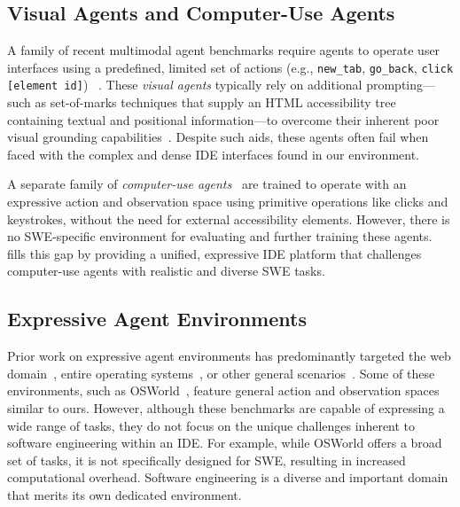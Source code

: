 \subsection{Visual Agents and Computer-Use Agents}

A family of recent multimodal agent benchmarks require agents to operate user interfaces using a predefined, limited set of actions (e.g., \texttt{new\_tab}, \texttt{go\_back}, \texttt{click [element id]})~\cite{koh2024visualwebarenaevaluatingmultimodalagents, deng2023mind2webgeneralistagentweb, zheng2024gpt} . 
These \textit{visual agents} typically rely on additional prompting—such as set-of-marks techniques that supply an HTML accessibility tree containing textual and positional information—to overcome their inherent poor visual grounding capabilities~\cite{yang2023setofmarkpromptingunleashesextraordinary}. 
Despite such aids, these agents often fail when faced with the complex and dense IDE interfaces found in our environment.

A separate family of \textit{computer-use agents}~\cite{anthropic2024developing,openai2025introducing,gou2024navigatingdigitalworldhumans} are trained to operate with an expressive action and observation space using primitive operations like clicks and keystrokes, without the need for external accessibility elements. However, there is no SWE-specific environment for evaluating and further training these agents. \ours{} fills this gap by providing a unified, expressive IDE platform that challenges computer-use agents with realistic and diverse SWE tasks.

\subsection{Expressive Agent Environments}

Prior work on expressive agent environments has predominantly targeted the web domain~\cite{koh2024visualwebarenaevaluatingmultimodalagents, deng2023mind2webgeneralistagentweb}, entire operating systems~\cite{xie2024osworldbenchmarkingmultimodalagents, bonatti2024windowsagentarenaevaluating, NEURIPS2023_bbbb6308}, or other general scenarios~\cite{xu2024theagentcompanybenchmarkingllmagents}. Some of these environments, such as OSWorld~\cite{xie2024osworldbenchmarkingmultimodalagents}, feature general action and observation spaces similar to ours. However, although these benchmarks are capable of expressing a wide range of tasks, they do not focus on the unique challenges inherent to software engineering within an IDE. For example, while OSWorld offers a broad set of tasks, it is not specifically designed for SWE, resulting in increased computational overhead. Software engineering is a diverse and important domain that merits its own dedicated environment.

